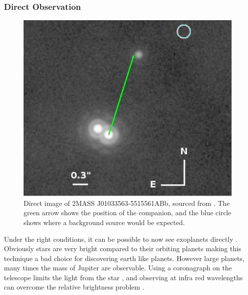 \subsubsection{Direct Observation}

\begin{figure}
    \centering
    \includegraphics[width=\columnwidth]{images/direct_image.png}
    \caption{Direct image of 2MASS J01033563-5515561ABb, sourced from \cite{delorme2013direct}. The green arrow shows the position of the companion, and the blue circle shows where a background source would be expected.}
    \label{fig:direct}
\end{figure}

Under the right conditions, it can be possible to now see exoplanets directly \citep{lafreniere2010directly,kuzuhara2013direct,delorme2013direct}. Obviously stars are very bright compared to their orbiting planets making this technique a bad choice for discovering earth like planets. However large planets, many times the mass of Jupiter are observable. Using a coronagraph on the telescope limits the light from the star \citep{kuchner2002coronagraph}, and observing at infra red wavelengths can overcome the relative brightness problem \citep{delorme2013direct}.
